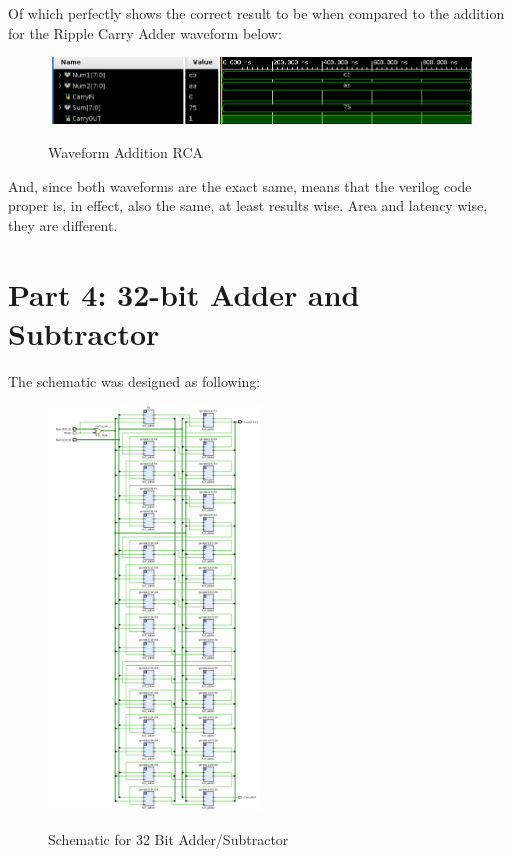 Of which perfectly shows the correct result to be when compared to the addition for the Ripple Carry Adder waveform below: 

\begin{figure}[!htbp]
    \centering
    \caption{Waveform Addition RCA}
    \includegraphics[width=1\textwidth]{part-3-waveform.png}
    \label{Waveform Part 3 B}
\end{figure}
\newpage
And, since both waveforms are the exact same, means that the verilog code proper is, in effect, also the same, at least results wise. Area and latency wise, they are different.
\newpage



\section{Part 4: 32-bit Adder and Subtractor}
The schematic was designed as following:
\begin{figure}[!htbp]
    \centering
    \caption{Schematic for 32 Bit Adder/Subtractor}
    \includegraphics[width=0.5\textwidth]{part-4-schem.png}
    \label{32 Bit Adder/Subtractor}
\end{figure}

